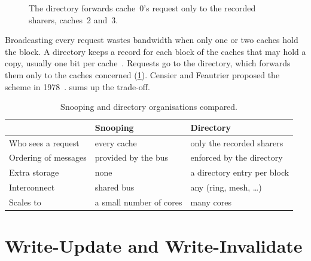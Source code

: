 \begin{figure}[htbp]
\begin{minipage}[c]{0.42\linewidth}
{}
\caption[A directory protocol]{The directory forwards cache~0's request only to
the recorded sharers, caches~2 and~3.}
\label{fig:directory}
\end{minipage}
\end{figure}

Broadcasting every request wastes bandwidth when only one or two caches hold the
block. A \gls{directory} keeps a record for each block of
the caches that may hold a copy, usually one bit per
cache~\cite[\S12.4.6]{sarangi2025basic}. Requests go to the directory, which
forwards them only to the caches concerned (\cref{fig:directory}). Censier and
Feautrier proposed the scheme in 1978~\cite{censier1978directory}.
 sums up the trade-off.

\begin{table}[htbp]
\centering
\caption{Snooping and directory organisations compared.}
\label{tab:snoop-dir}
\small
\begin{tabular}{@{}l p{4.8cm} p{4.8cm}@{}}
\toprule
 & Snooping & Directory \\
\midrule
Who sees a request & every cache & only the recorded sharers \\
Ordering of messages & provided by the bus & enforced by the directory \\
Extra storage & none & a directory entry per block \\
Interconnect & shared bus & any (ring, mesh, \ldots) \\
Scales to & a small number of cores & many cores \\
\bottomrule
\end{tabular}
\end{table}

\section{Write-Update and Write-Invalidate}
\label{sec:coh-update-invalidate}
\label{sec:coh-choose}
%

